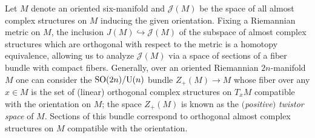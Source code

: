 Let $M$ denote an oriented six-manifold and $\mathcal J(M)$ be the space of
all almost complex structures on $M$ inducing the given orientation.
Fixing a Riemannian metric on $M$, the inclusion $J(M) \hookrightarrow \mathcal J(M)$ of the subspace of almost complex structures which are orthogonal with respect to the metric is a homotopy equivalence, allowing us to analyze $\mathcal J(M)$ via a space of sections of a fiber bundle with compact fibers. Generally, over an oriented Riemannian $2n$-manifold $M$ one can consider the ${\rm SO}(2n)/{\rm U}(n)$ bundle
$Z_+(M) \to M$ whose fiber over any $x \in M$ is the set of (linear) orthogonal complex structures on $T_x M$ compatible with the orientation on $M$; the space $Z_+(M)$ is known as the \emph{$($positive$)$ twistor space} of $M$. Sections of this bundle correspond to orthogonal almost complex structures on $M$ compatible with the orientation.
